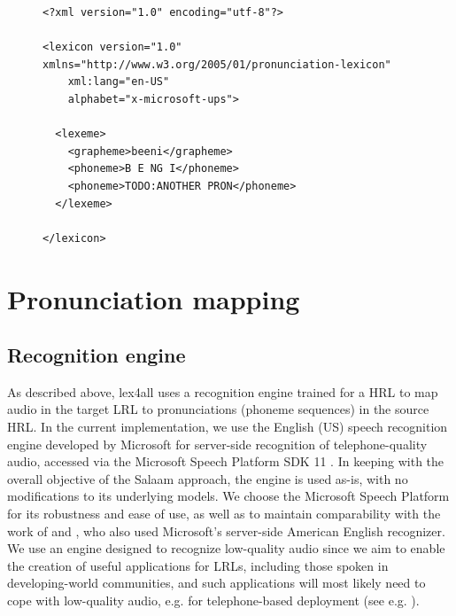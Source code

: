 \documentclass[11pt]{article}
\begin{document}
\begin{figure}
\begin{lstlisting}[caption=Example lexicon file mapping the Yoruba word \textit{beeni} (``yes'') to two possible sequences of American English phonemes., label=lst:lexicon]
<?xml version="1.0" encoding="utf-8"?>
	  
<lexicon version="1.0" xmlns="http://www.w3.org/2005/01/pronunciation-lexicon" 
	xml:lang="en-US" 
	alphabet="x-microsoft-ups">
		 
  <lexeme>
    <grapheme>beeni</grapheme>
    <phoneme>B E NG I</phoneme>
    <phoneme>TODO:ANOTHER PRON</phoneme>
  </lexeme>
  
</lexicon>
\end{lstlisting}
\end{figure}



\section{Pronunciation mapping}
\label{sec:backend}

\subsection{Recognition engine}
\label{sec:engine}
As described above, lex4all uses a recognition engine trained for a HRL to map audio in the target LRL to pronunciations (phoneme sequences) in the source HRL. 
In the current implementation, we use the English (US) speech recognition engine developed by Microsoft for server-side recognition of telephone-quality audio, accessed via the Microsoft Speech Platform SDK 11 \cite{mspsdk}. 
In keeping with the overall objective of the Salaam approach, the engine is used as-is, with no modifications to its underlying models. 
We choose the Microsoft Speech Platform for its robustness and ease of use, as well as to maintain comparability with the work of  and , who also used Microsoft's server-side American English recognizer. 
We use an engine designed to recognize low-quality audio since we aim to enable the creation of useful applications for LRLs, including those spoken in developing-world communities, and such applications will most likely need to cope with low-quality audio, e.g. for telephone-based deployment (see e.g. ).
\end{document}

